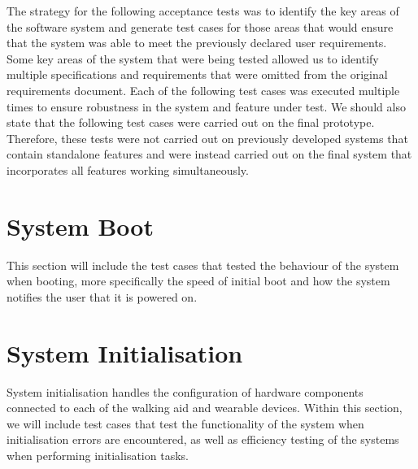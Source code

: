     The strategy for the following acceptance tests was to identify the key areas of the software system and generate test cases for those areas that would ensure that the system was able to meet the previously declared user requirements. Some key areas of the system that were being tested allowed us to identify multiple specifications and requirements that were omitted from the original requirements document. Each of the following test cases was executed multiple times to ensure robustness in the system and feature under test. We should also state that the following test cases were carried out on the final prototype. Therefore, these tests were not carried out on previously developed systems that contain standalone features and were instead carried out on the final system that incorporates all features working simultaneously.


    \section{System Boot}
    \label{sec:test_boot}

        This section will include the test cases that tested the behaviour of the system when booting, more specifically the speed of initial boot and how the system notifies the user that it is powered on.

        \vspace{1em}
        

        \vspace{4em}
        

        \vspace{4em}
        

        \vspace{4em}
        

    \section{System Initialisation}
    \label{sec:test_init}

        System initialisation handles the configuration of hardware components connected to each of the walking aid and wearable devices. Within this section, we will include test cases that test the functionality of the system when initialisation errors are encountered, as well as efficiency testing of the systems when performing initialisation tasks.

